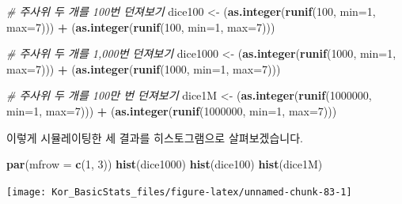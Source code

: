\documentclass[]{book}
\newenvironment{Shaded}{\begin{snugshade}}{\end{snugshade}}
\newcommand{\CommentTok}[1]{\textcolor[rgb]{0.56,0.35,0.01}{\textit{#1}}}
\newcommand{\DataTypeTok}[1]{\textcolor[rgb]{0.13,0.29,0.53}{#1}}
\newcommand{\DecValTok}[1]{\textcolor[rgb]{0.00,0.00,0.81}{#1}}
\newcommand{\KeywordTok}[1]{\textcolor[rgb]{0.13,0.29,0.53}{\textbf{#1}}}
\newcommand{\NormalTok}[1]{#1}
\newcommand{\OperatorTok}[1]{\textcolor[rgb]{0.81,0.36,0.00}{\textbf{#1}}}
\newcommand{\StringTok}[1]{\textcolor[rgb]{0.31,0.60,0.02}{#1}}
\begin{document}
\begin{Shaded}
\begin{Highlighting}[]
\CommentTok{# 주사위 두 개를 100번 던져보기}
\NormalTok{dice100 <-}\StringTok{  }\NormalTok{(}\KeywordTok{as.integer}\NormalTok{(}\KeywordTok{runif}\NormalTok{(}\DecValTok{100}\NormalTok{, }\DataTypeTok{min=}\DecValTok{1}\NormalTok{, }\DataTypeTok{max=}\DecValTok{7}\NormalTok{))) }\OperatorTok{+}
\StringTok{  }\NormalTok{(}\KeywordTok{as.integer}\NormalTok{(}\KeywordTok{runif}\NormalTok{(}\DecValTok{100}\NormalTok{, }\DataTypeTok{min=}\DecValTok{1}\NormalTok{, }\DataTypeTok{max=}\DecValTok{7}\NormalTok{)))}

\CommentTok{# 주사위 두 개를 1,000번 던져보기}
\NormalTok{dice1000 <-}\StringTok{  }\NormalTok{(}\KeywordTok{as.integer}\NormalTok{(}\KeywordTok{runif}\NormalTok{(}\DecValTok{1000}\NormalTok{, }\DataTypeTok{min=}\DecValTok{1}\NormalTok{, }\DataTypeTok{max=}\DecValTok{7}\NormalTok{))) }\OperatorTok{+}
\StringTok{  }\NormalTok{(}\KeywordTok{as.integer}\NormalTok{(}\KeywordTok{runif}\NormalTok{(}\DecValTok{1000}\NormalTok{, }\DataTypeTok{min=}\DecValTok{1}\NormalTok{, }\DataTypeTok{max=}\DecValTok{7}\NormalTok{)))}

\CommentTok{# 주사위 두 개를 100만 번 던져보기}
\NormalTok{dice1M <-}\StringTok{  }\NormalTok{(}\KeywordTok{as.integer}\NormalTok{(}\KeywordTok{runif}\NormalTok{(}\DecValTok{1000000}\NormalTok{, }\DataTypeTok{min=}\DecValTok{1}\NormalTok{, }\DataTypeTok{max=}\DecValTok{7}\NormalTok{))) }\OperatorTok{+}\StringTok{ }
\StringTok{  }\NormalTok{(}\KeywordTok{as.integer}\NormalTok{(}\KeywordTok{runif}\NormalTok{(}\DecValTok{1000000}\NormalTok{, }\DataTypeTok{min=}\DecValTok{1}\NormalTok{, }\DataTypeTok{max=}\DecValTok{7}\NormalTok{)))}
\end{Highlighting}
\end{Shaded}

이렇게 시뮬레이팅한 세 결과를 히스토그램으로 살펴보겠습니다.

\begin{Shaded}
\begin{Highlighting}[]
\KeywordTok{par}\NormalTok{(}\DataTypeTok{mfrow =} \KeywordTok{c}\NormalTok{(}\DecValTok{1}\NormalTok{, }\DecValTok{3}\NormalTok{))}
\KeywordTok{hist}\NormalTok{(dice1000)}
\KeywordTok{hist}\NormalTok{(dice100)}
\KeywordTok{hist}\NormalTok{(dice1M)}
\end{Highlighting}
\end{Shaded}

\begin{center}\texttt{[image: Kor\_BasicStats\_files/figure-latex/unnamed-chunk-83-1]} \end{center}
\end{document}
